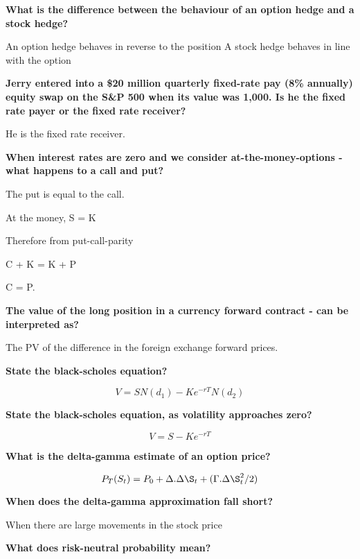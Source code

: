 \documentclass[12pt]{article}
\begin{document}
\newpage

\textbf{What is the difference between the behaviour of an option hedge and a stock hedge?}

An option hedge behaves in reverse to the position
A stock hedge behaves in line with the option

\textbf{Jerry entered into a \$20 million quarterly fixed-rate pay (8\% annually) equity swap on the S\&P 500 when its value was 1,000. Is he the fixed rate payer or the fixed rate receiver?}
	
He is the fixed rate receiver.

\textbf{When interest rates are zero and we consider at-the-money-options - what happens to a call and put?}

The put is equal to the call. 

At the money, S = K

Therefore from put-call-parity

C + K = K + P

C = P.



\textbf{The value of the long position in a currency forward contract - can be interpreted as?}

The PV of the difference in the foreign exchange forward prices.

\begin{framed}
	
	\textbf{State the black-scholes equation?}
	
	$$
	V = S N(d_1) - Ke^{-rT} N(d_2)
	$$
	
		\textbf{State the black-scholes equation, as volatility approaches zero?}
	
	$$
	V = S - Ke^{-rT} 
	$$
	
	
\end{framed}

\begin{framed}
	
	\textbf{What is the delta-gamma estimate of an option price?}
	
	$$
	P_T(S_t) = P_0 + \Delta. \Delta \S_t + (\Gamma. \Delta \S_t^2 / 2)
	$$
	
	\textbf{When does the delta-gamma approximation fall short?}
	
	When there are large movements in the stock price 
	
\end{framed}

\textbf{What does risk-neutral probability mean?}
\end{document}
